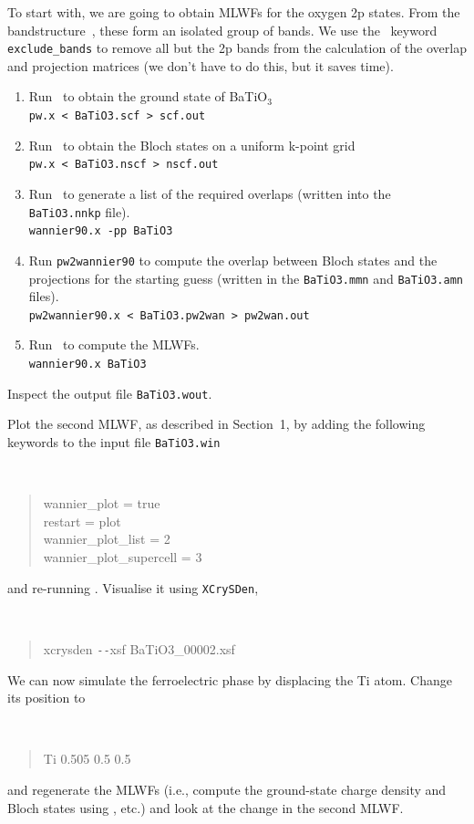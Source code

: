 \documentclass[a4paper,11pt,twoside]{article}
\begin{document}
 To start with, we are going to obtain MLWFs for the oxygen 2p
  states. From the bandstructure~\cite{marzari-arxiv98}, these form an isolated
  group of bands. We use the \wannier\ keyword {\tt exclude\_bands} to
  remove all but the 2p bands from the calculation of the overlap
  and projection matrices (we don't have to do this, but it saves time).

\begin{enumerate}
\item Run \pwscf\ to obtain the ground state of BaTiO$_3$\\
{\tt pw.x < BaTiO3.scf > scf.out}

\item Run \pwscf\ to obtain the Bloch states on a uniform k-point grid\\
{\tt pw.x < BaTiO3.nscf > nscf.out}

\item Run \wannier\ to generate a list of the required overlaps (written
  into the {\tt BaTiO3.nnkp} file).\\ 
{\tt wannier90.x -pp BaTiO3}

\item Run {\tt pw2wannier90} to compute the overlap between Bloch
  states and the projections for the starting guess (written in the
  {\tt BaTiO3.mmn} and {\tt BaTiO3.amn} files).\\  
{\tt pw2wannier90.x < BaTiO3.pw2wan > pw2wan.out}

\item Run \wannier\ to compute the MLWFs.\\
{\tt wannier90.x BaTiO3}
\end{enumerate}

Inspect the output file {\tt BaTiO3.wout}. 

Plot the second MLWF, as described in Section~1, by adding the
following keywords to the input file {\tt BaTiO3.win}
{\tt
\begin{quote}
wannier\_plot = true\\
restart = plot\\
wannier\_plot\_list = 2\\
wannier\_plot\_supercell = 3
\end{quote} }
and re-running \wannier. Visualise it using {\tt XCrySDen},
{\tt
\begin{quote}
xcrysden \texttt{-{}-}xsf BaTiO3\_00002.xsf
\end{quote} }

We can now simulate the ferroelectric phase by displacing the Ti
  atom. Change its position to 
{\tt
\begin{quote}
Ti 0.505 0.5 0.5
\end{quote}
}
and regenerate the MLWFs (i.e., compute the ground-state charge
density and Bloch states using \pwscf, etc.) and look at the change in
the second MLWF.
\end{document}
